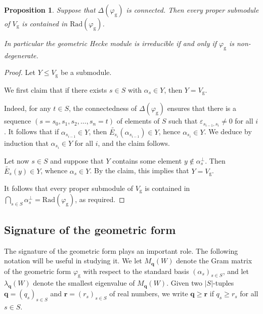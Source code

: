 \documentclass[12pt,a4paper]{amsproc}
\newtheorem{proposition}[theorem]{Proposition}
\theoremstyle{definition}
\newcommand{\qq}{\mathbf q}
\newcommand{\rg}{\mathrm g}
\begin{document}
\begin{proposition}\label{prop:geom-irreducibility}
Suppose that $\Delta(\varphi_\rg)$ is connected. Then every proper submodule of $V_{\mathrm g}$ is contained in $\mathrm{Rad}( \varphi_{\mathrm g})$. 

In particular  the geometric Hecke module is irreducible if and only if   $\varphi_{\mathrm g}$ is non-degenerate. 
\end{proposition}
\begin{proof}
Let  $Y \leq V_{\mathrm g}$ be a submodule. 

\medskip
We first claim that if there exists $s \in S$ with  $\alpha_s \in Y$, then $Y = V_\rg$. 

Indeed, for any $t \in S$, the connectedness  of   $\Delta(\varphi_\rg)$ ensures that there is a sequence  $(s = s_0, s_1, s_2, \dots, s_n = t)$ of elements of $S$ such that $\varepsilon_{s_{i-1}, s_i} \neq 0$ for all $i$. It follows that if $\alpha_{s_{i-1}} \in Y$, then $\widetilde{E_{s_i}}(\alpha_{s_{i-1}}) \in Y$, hence $\alpha_{s_{i}} \in Y$. We deduce by induction that $\alpha_{s_{i}} \in Y$ for all  $i$, and the claim follows.


 \medskip
 Let now $s \in S$ and suppose that $Y$ contains some element  $y \not \in \alpha_s^\perp$. Then $\widetilde{E_{s}}(y) \in Y$, whence $\alpha_s \in Y$. By the claim, this implies that $Y = V_\rg$. 
 
It follows that every proper submodule of $V_\rg$ is contained in  $\bigcap_{s \in S}  \alpha_s^\perp = \mathrm{Rad}( \varphi_{\mathrm g})$, as required. 
\end{proof}
 
 
 
 \subsection{Signature of the geometric form}

The signature of the geometric form plays an important role. The following notation will be useful in studying it. We let $M_\qq(W)$ denote the Gram matrix of the geometric form $\varphi_\rg$ with respect to the standard basis $(\alpha_s)_{s \in S}$, and let $\lambda_\qq(W)$ denote the smallest eigenvalue of $M_\qq(W)$. Given two $|S|$-tuples $\qq= (q_s)_{s \in S}$ and $\mathbf r = (r_s)_{s \in S}$ of real numbers, we write $\qq \geq \mathbf r$ if $q_s \geq r_s$ for all $s \in S$. 
\end{document}
